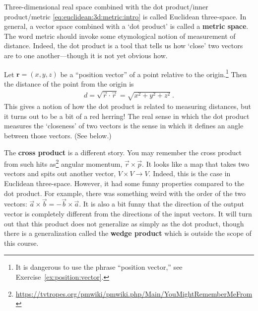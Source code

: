 \documentclass[12pt, oneside]{report}    %
\begin{document}
Three-dimensional real space combined with the dot product/inner product/metric \eqref{eq:euclidean:3d:metric:intro} is called Euclidean three-space. In general, a vector space combined with a `dot product' is called a \textbf{metric space}. The word metric should invoke some etymological notion of measurement of distance. Indeed, the dot product is a tool that tells us how `close' two vectors are to one another---though it is not yet obvious how.

\begin{example}
Let $\mathbf{r}=(x,y,z)$ be a ``position vector'' of a point relative to the origin.\footnote{It is dangerous to use the phrase ``position vector,'' see Exercise~\ref{ex:position:vector}.} Then the distance of the point from the origin is
\begin{align}
    d = \sqrt{\vec{r}\cdot\vec{r}} =
    \sqrt{x^2+y^2 +z^2} \ .
    \label{eq:distance:in:space}
\end{align}
This gives a notion of how the dot product is related to measuring distances, but it turns out to be a bit of a red herring! The real sense in which the dot product measures the `closeness' of two vectors is the sense in which it defines an angle between those vectors. (See below.)
\end{example}


The \textbf{cross product} is a different story. You may remember the cross product from such hits as\footnote{\url{https://tvtropes.org/pmwiki/pmwiki.php/Main/YouMightRememberMeFrom}} angular momentum, $\vec{r}\times\vec{p}$. It looks like a map that takes two vectors and spits out another vector, $V\times V \to V$. Indeed, this is the case in Euclidean three-space. However, it had some funny properties compared to the dot product. For example, there was something weird with the order of the two vectors: $\vec{a}\times \vec{b}  = - \vec{b}\times \vec{a}$. It is also a bit funny that the direction of the output vector is completely different from the directions of the input vectors. It will turn out that this product does not generalize as simply as the dot product, though there is a generalization called the \textbf{wedge product} which is outside the scope of this course.
\end{document}
